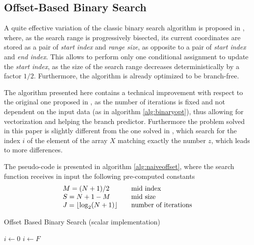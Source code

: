 \documentclass[preprint,1p,times]{elsarticle}
\begin{document}
\subsection{Offset-Based Binary Search}
A quite effective variation of the classic binary search algorithm is proposed in \cite{Morin2015}, where, as the search range is progressively bisected, its current coordinates are stored as a pair of \textit{start index} and \textit{range size}, as opposite to a pair of \textit{start index} and \textit{end index}. This allows to perform only one conditional assignment to update the \textit{start index}, as the size of the search range decreases deterministically by a factor $1/2$. Furthermore, the algorithm is already optimized to be branch-free.

The algorithm presented here contains a technical improvement with respect to the original one proposed in \cite{Morin2015}, as the number of iterations is fixed and not dependent on the input data (as in algorithm \ref{alg:binaryopt}), thus allowing for vectorization and helping the branch predictor. Furthermore the problem solved in this paper is slightly different from the one solved in \cite{Morin2015}, which search for the index $i$ of the element of the array $X$ matching exactly the number $z$, which leads to more differences.

The pseudo-code is presented in algorithm \ref{alg:naiveoffset}, where the search function receives in input the following pre-computed constants
$$
	\begin{array}{lll}
		M=(N+1)/2 & & \text{mid index}  \\
		S=N+1-M  & & \text{mid size} \\
		J=\left \lfloor \log_2(N+1) \right \rfloor & & \text{number of iterations}
	\end{array}
$$

\begin{algorithm}
	\caption{Offset Based Binary Search  (scalar implementation)}
	\label{alg:naiveoffset}
	\begin{algorithmic}
		
		\State $i \leftarrow 0$
		  
			\State $i \leftarrow F$ 
		\EndIf
			  
			\EndIf
		\EndWhile
		\EndFunction
	\end{algorithmic}
\end{algorithm}
\end{document}
